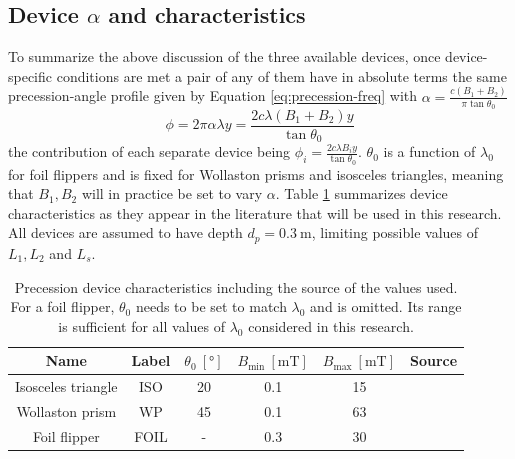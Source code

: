 \subsection{Device $\alpha$ and characteristics}
\label{c3.3.4}
To summarize the above discussion of the three available devices, once device-specific conditions are met a pair of any of them have in absolute terms the same precession-angle profile given by Equation \eqref{eq:precession-freq} with $\alpha = \frac{c(B_1 + B_2)}{\pi\tan\theta_0}$
\begin{equation}
	\phi = 2\pi\alpha\lambda y = \frac{2c\lambda (B_1 + B_2)y}{\tan\theta_0} \label{eq:device-prec}
\end{equation}
the contribution of each separate device being $\phi_i = \frac{2c\lambda B_i y}{\tan\theta_0}$. $\theta_0$ is a function of $\lambda_0$ for foil flippers and is fixed for Wollaston prisms and isosceles triangles, meaning that $B_1, B_2$ will in practice be set to vary $\alpha$. Table \ref{tab:device-properties} summarizes device characteristics as they appear in the literature that will be used in this research. All devices are assumed to have depth $d_p = \SI{0.3}{\meter}$, limiting possible values of $L_1, L_2$ and $L_s$. 
\begin{table}[h!]
	\centering
	\begin{tabular}{c|c c c c c}
		\toprule
		Name & Label & $\theta_0~[\unit{\degree}]$ & $B_{\text{min}}~[\unit{\milli\tesla}]$ & $B_{\text{max}} ~[\unit{\milli\tesla}]$ & Source \\
		\midrule
		Isosceles triangle & ISO & \num{20} & \num{0.1} & \num{15} & \cite{kusmin2017} \\
		Wollaston prism & WP & \num{45} & \num{0.1} & \num{63} & \cite{li2021} \\
		Foil flipper & FOIL & - & \num{0.3} & \num{30} & \cite{bouwman2011} \\
		\bottomrule
	\end{tabular}
	\caption{Precession device characteristics including the source of the values used. For a foil flipper, $\theta_0$ needs to be set to match $\lambda_0$ and is omitted. Its range is sufficient for all values of $\lambda_0$ considered in this research.}
	\label{tab:device-properties}
\end{table}
